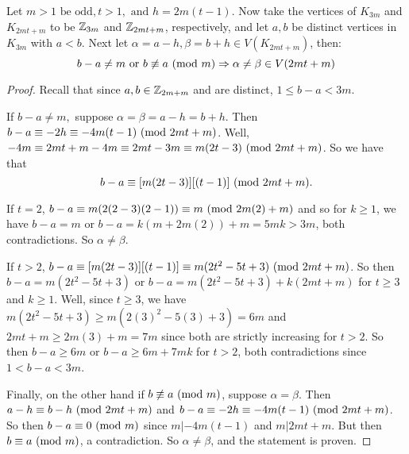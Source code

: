 \begin{thm}
  Let $m>1\text{ be odd},t>1,\text{ and } h = 2m(t-1)$. Now take the vertices of $K_{3m}$ and $K_{2mt+m}$ to be $\mathbb{Z}_{3m}$ and $\mathbb{Z}_{2mt+m}$, respectively, and let $a,b$ be distinct vertices in $K_{3m}$ with $a<b$. Next let $\alpha = a-h,\beta = b+h\in V(K_{2mt+m})$, then:
    $$b-a\neq m\text{ or }b\not\equiv a\ (\mathrm{mod}\ m)\Rightarrow \alpha\neq\beta\in V(2mt+m)$$

    \begin{proof}
        Recall that since $a,b\in \mathbb{Z}_{2m+m}$ and are distinct, $1\leq b-a<3m$.\newline 
        
        \noindent If $b-a\neq m,$ suppose $\alpha = \beta = a-h=b+h$. Then $b-a\equiv -2h\equiv -4m(t-1)\ (\mathrm{mod}\ 2mt+m)$. Well,  $-4m \equiv 2mt+m-4m\equiv 2mt-3m\equiv m(2t-3)\ (\mathrm{mod}\ 2mt+m)$. So we have that $$b-a\equiv [m(2t-3)][(t-1)]\ (\mathrm{mod}\ 2mt+m).$$
        
        \noindent If $t=2$, $b-a\equiv m(2(2-3)(2-1))\equiv m\ (\mathrm{mod}\ 2m(2)+m)$ and so for $k\geq 1$, we have $b-a = m$ or $b-a= k(m+2m(2))+m = 5mk>3m$, both contradictions. So $\alpha\neq \beta$.\newline
        
        \noindent If $t>2$, $b-a\equiv [m(2t-3)][(t-1)] \equiv m(2t^{2}-5t+3)\ (\mathrm{mod}\ 2mt+m)$. So then $b-a=m(2t^{2}-5t+3)$ or $b-a=m(2t^{2}-5t+3) + k(2mt+m)$ for $t\geq 3$ and $k\geq 1$. Well, since $t\geq 3$, we have $m(2t^{2}-5t+3)\geq m(2(3)^{2}-5(3)+3)=6m$ and $2mt+m\geq 2m(3)+m=7m$ since both are strictly increasing for $t>2$. So then $b-a\geq 6m$ or $b-a\geq 6m+7mk$ for $t>2$, both contradictions since $1<b-a<3m$.\newline

        \noindent Finally, on the other hand if $b\not\equiv a\ (\mathrm{mod}\ m)$, suppose $\alpha = \beta$. Then $a-h\equiv b-h \ (\mathrm{mod}\ 2mt+m)$ and $b-a\equiv -2h\equiv -4m(t-1)\ (\mathrm{mod}\ 2mt+m)$. So then $b-a\equiv 0\ (\mathrm{mod}\ m)$ since $m|-4m(t-1)$ and $m|2mt+m.$ But then $b\equiv a\ (\mathrm{mod}\ m)$, a contradiction. So $\alpha\neq \beta$, and the statement is proven.
        
    \end{proof}
\end{thm}

